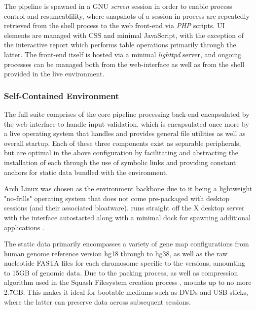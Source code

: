 The pipeline is spawned in a GNU \textit{screen} session in order to enable process control and resumeablility, where snapshots of a session in-process are repeatedly retrieved from the shell process to the web front-end via \textit{PHP} scripts. UI elements are managed with CSS and minimal JavaScript, with the exception of the interactive report which performs table operations primarily through the latter. The front-end itself is hosted via a minimal \textit{lighttpd} server, and ongoing \app{} processes can be managed both from the web-interface as well as from the shell provided in the live environment.


\subsubsection{Self-Contained Environment}

The full \app{} suite comprises of the core pipeline processing back-end encapsulated by the web-interface to handle input validation, which is encapsulated once more by a live operating system that handles and provides general file utilities as well as overall startup. Each of these three components exist as separable peripherals, but are optimal in the above configuration by facilitating and abstracting the installation of each through the use of symbolic links and providing constant anchors for static data bundled with the environment.

Arch Linux was chosen as the environment backbone due to it being a lightweight "no-frills" operating system that does not come pre-packaged with desktop sessions (and their associated bloatware). \app{} runs straight off the X desktop server with the \app{} interface autostarted along with a minimal dock for spawning additional applications \cite{scheifler1986x}.

The static data primarily encompasses a variety of gene map configurations from human genome reference version hg18 through to hg38, as well as the raw nucleotide FASTA files for each chromosome specific to the versions, amounting to 15GB of genomic data. Due to the packing process, as well as compression algorithm used in the Squash Filesystem creation process \cite{lougher2008squashfs}, \app{} mounts up to no more 2.7GB. This makes it ideal for bootable mediums such as DVDs and USB sticks, where the latter can preserve data across subsequent sessions.